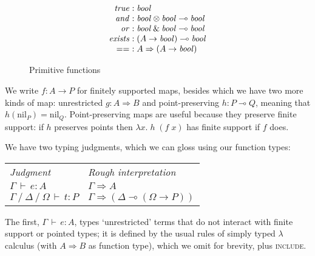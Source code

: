 \documentclass[sigplan, screen, dvipsnames]{acmart}
\newcommand\name[1]{\ensuremath{\mathit{#1}}}
\newcommand\fnspace{\;}
\newcommand\fn[1]{\lambda{#1}.\fnspace}
\newcommand\<\;                 %
\newcommand\cto{\Rightarrow}    %
\newcommand\lto\multimap        %
\newcommand\fto{\rightarrow}    %
\newcommand\with{\mathbin{\&}}
\newcommand\ox\otimes
\newcommand\tbool{\name{bool}}
\newcommand\G\Gamma
\newcommand\D\Delta
\renewcommand\O\Omega
\newcommand\cxsep{\mathbin{/}}
\newcommand\cJ[3]{{#3} \,\vdash\, {#1} : {#2}}
\newcommand\J[5]{{#3} \cxsep {#4} \cxsep {#5} \,\vdash\, {#1} : {#2}}
\newcommand\cname\text          %
\newcommand\cnil{\cname{nil}}
\newcommand\tnil\cnil
\begin{document}
\begin{figure}
  \[\begin{array}{r@{\hskip 0.3em}l}
    \name{true} &: \tbool\\
    \name{and} &: \tbool \ox \tbool \lto \tbool\\
    \name{or} &: \tbool \with \tbool \lto \tbool\\
    \name{exists} &: (A \fto \tbool) \lto \tbool\\
    \name{==} &: A \cto (A \fto \tbool)
  \end{array}\]\vspace{-1\baselineskip}
  \caption{Primitive functions}
  \label{fig-primitives}
\end{figure}

We write $f : A \fto P$ for finitely supported maps, besides which we have two more kinds of map: unrestricted $g : A \cto B$ and point-preserving $h : P \lto Q$, meaning that $h(\tnil_P) = \tnil_Q$.
%
Point-preserving maps are useful because they preserve finite support: if $h$ preserves points then $\fn x h \<(f \<x)$ has finite support if $f$ does.

We have two typing judgments, which we can gloss using our function types:

\begin{center}
  \begin{tabular}{l@{\hskip 2em}l}
    \em Judgment & \em Rough interpretation
    \\
    $\cJ e A \G$ & $\G \cto A$
    \\
    $\J t P \G \D \O$ & $\G \cto (\D \lto (\O \fto P))$
  \end{tabular}
\end{center}

\noindent
The first, $\cJ e A \G$, types `unrestricted' terms that do not interact with finite support or pointed types; it is defined by the usual rules of simply typed $\lambda$ calculus (with $A \cto B$ as function type), which we omit for brevity, plus \textsc{include}.
\end{document}
